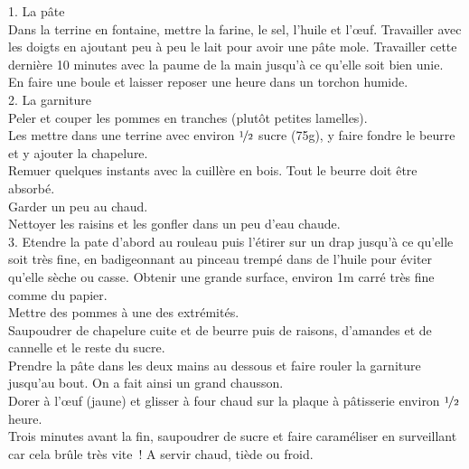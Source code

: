 \begin{minipage}[c]{\textwidth}
1. La pâte\\
Dans la terrine en fontaine, mettre la farine, le sel, l’huile et l’œuf. Travailler avec les doigts en ajoutant peu à peu le lait pour avoir une pâte mole. Travailler cette dernière 10 minutes avec la paume de la main jusqu’à ce qu’elle soit bien unie. \\
En faire une boule et laisser reposer une heure dans un torchon humide. \\
2. La garniture\\
Peler et couper les pommes en tranches  (plutôt petites lamelles).\\
Les mettre dans une terrine avec environ $\nicefrac{1}{2}$ sucre (75g), y faire fondre le beurre et y ajouter la chapelure. \\
Remuer quelques instants avec la cuillère en bois. Tout le beurre doit être absorbé. \\
Garder un peu au chaud. \\
Nettoyer les raisins et les gonfler dans un peu d’eau chaude. \\
3. Etendre la pate d’abord au rouleau puis l’étirer sur un drap jusqu’à ce qu’elle soit très fine, en badigeonnant au pinceau trempé dans de l’huile pour éviter qu’elle sèche ou casse. Obtenir une grande surface, environ 1m carré très fine comme du papier. \\
Mettre des pommes à une des extrémités. \\
Saupoudrer de chapelure cuite et de beurre puis de raisons, d’amandes et de cannelle et le reste du sucre.\\
Prendre la pâte dans les deux mains au dessous et faire rouler la garniture jusqu’au bout. On a fait ainsi un grand chausson. \\
Dorer à l’œuf (jaune) et glisser à four chaud sur la plaque à pâtisserie environ $\nicefrac{1}{2}$ heure. \\
Trois minutes avant la fin, saupoudrer de sucre et faire caraméliser en surveillant car cela brûle très vite ! A servir chaud, tiède ou froid.\\
\\

\end{minipage}

